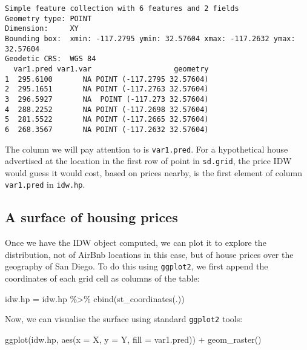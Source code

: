 \documentclass[
  letterpaper,
  krantz2]{style/krantz}
\newenvironment{Shaded}{\begin{snugshade}}{\end{snugshade}}
\newcommand{\AttributeTok}[1]{\textcolor[rgb]{0.40,0.45,0.13}{#1}}
\newcommand{\FunctionTok}[1]{\textcolor[rgb]{0.28,0.35,0.67}{#1}}
\newcommand{\NormalTok}[1]{\textcolor[rgb]{0.00,0.23,0.31}{#1}}
\newcommand{\OtherTok}[1]{\textcolor[rgb]{0.00,0.23,0.31}{#1}}
\newcommand{\SpecialCharTok}[1]{\textcolor[rgb]{0.37,0.37,0.37}{#1}}
\begin{document}
\begin{verbatim}
Simple feature collection with 6 features and 2 fields
Geometry type: POINT
Dimension:     XY
Bounding box:  xmin: -117.2795 ymin: 32.57604 xmax: -117.2632 ymax: 32.57604
Geodetic CRS:  WGS 84
  var1.pred var1.var                   geometry
1  295.6100       NA POINT (-117.2795 32.57604)
2  295.1651       NA POINT (-117.2763 32.57604)
3  296.5927       NA  POINT (-117.273 32.57604)
4  288.2252       NA POINT (-117.2698 32.57604)
5  281.5522       NA POINT (-117.2665 32.57604)
6  268.3567       NA POINT (-117.2632 32.57604)
\end{verbatim}

The column we will pay attention to is \texttt{var1.pred}. For a
hypothetical house advertised at the location in the first row of point
in \texttt{sd.grid}, the price IDW would guess it would cost, based on
prices nearby, is the first element of column \texttt{var1.pred} in
\texttt{idw.hp}.

\hypertarget{a-surface-of-housing-prices}{%
\subsection{A surface of housing
prices}\label{a-surface-of-housing-prices}}

Once we have the IDW object computed, we can plot it to explore the
distribution, not of AirBnb locations in this case, but of house prices
over the geography of San Diego. To do this using \texttt{ggplot2}, we
first append the coordinates of each grid cell as columns of the table:

\begin{Shaded}
\begin{Highlighting}[]
\NormalTok{idw.hp }\OtherTok{=}\NormalTok{ idw.hp }\SpecialCharTok{\%\textgreater{}\%}
  \FunctionTok{cbind}\NormalTok{(}\FunctionTok{st\_coordinates}\NormalTok{(.))}
\end{Highlighting}
\end{Shaded}

Now, we can visualise the surface using standard \texttt{ggplot2} tools:

\begin{Shaded}
\begin{Highlighting}[]
\FunctionTok{ggplot}\NormalTok{(idw.hp, }\FunctionTok{aes}\NormalTok{(}\AttributeTok{x =}\NormalTok{ X, }\AttributeTok{y =}\NormalTok{ Y, }\AttributeTok{fill =}\NormalTok{ var1.pred)) }\SpecialCharTok{+}
  \FunctionTok{geom\_raster}\NormalTok{()}
\end{Highlighting}
\end{Shaded}
\end{document}

